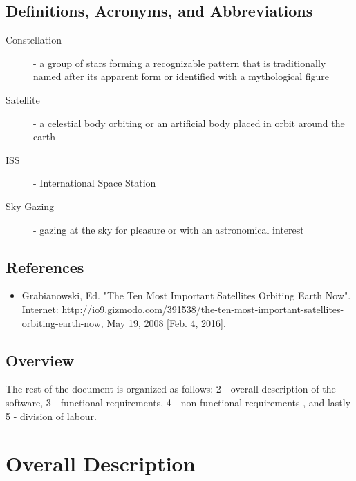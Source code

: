 \documentclass[]{article}
\begin{document}
\subsection{Definitions, Acronyms, and Abbreviations}
\label{sub:definitions_acronyms_and_abbreviations}
\begin{description}
	\item[Constellation] - a group of stars forming a recognizable pattern that is traditionally named after its apparent form or identified with a mythological figure
	\item[Satellite] - a celestial body orbiting or an artificial body placed in orbit around the earth
	\item[ISS] - International Space Station
	\item[Sky Gazing] - gazing at the sky for pleasure or with an astronomical interest
\end{description}

\subsection{References}
\label{sub:references}
\begin{itemize}
	\item Grabianowski, Ed. "The Ten Most Important Satellites Orbiting Earth Now". Internet: \url{http://io9.gizmodo.com/391538/the-ten-most-important-satellites-orbiting-earth-now}, May 19, 2008 [Feb. 4, 2016].
\end{itemize}

\subsection{Overview}
\label{sub:overview}
The rest of the document is organized as follows: 2 - overall description of the software, 3 - functional requirements, 4 - non-functional requirements , and lastly 5 - division of labour.



\section{Overall Description}
\label{sec:overall_description}
\end{document}
